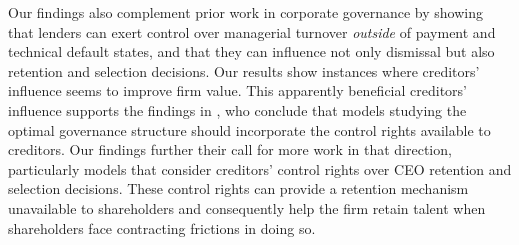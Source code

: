 \documentclass[a4paper,12pt]{article}
\begin{document}
Our findings also complement prior work in corporate governance by showing that lenders can exert control over managerial turnover \textit{outside} of payment and technical default states, and that they can influence not only dismissal but also retention and selection decisions.
Our results show instances where creditors' influence seems to improve firm value.
This apparently beneficial creditors' influence supports the findings in \cite{Nini_2012}, who conclude that models studying the optimal governance structure should incorporate the control rights available to creditors.
Our findings further their call for more work in that direction, particularly models that consider creditors' control rights over CEO retention and selection decisions.
These control rights can provide a retention mechanism unavailable to shareholders and consequently help the firm retain talent when shareholders face contracting frictions in doing so.





















\clearpage
{\singlespacing
    
    
}
\end{document}
